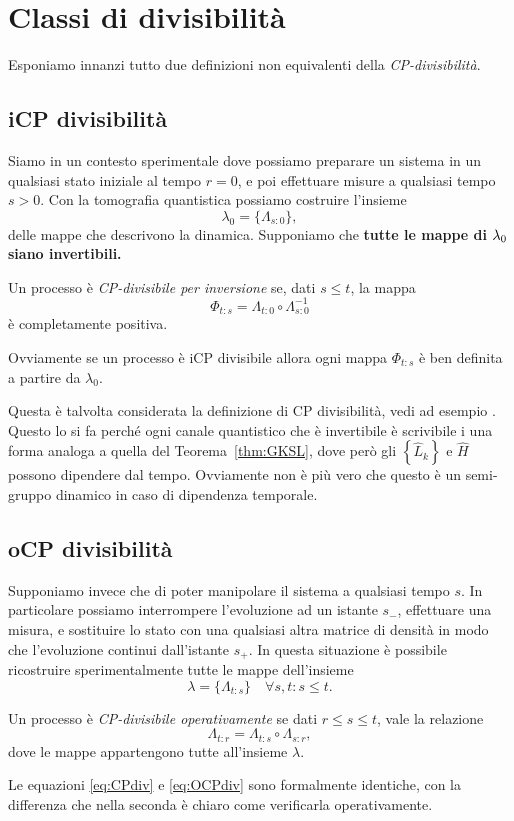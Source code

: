 \documentclass[a4]{article}
\begin{document}
\section{Classi di divisibilità}
Esponiamo innanzi tutto due definizioni non equivalenti della \emph{CP-divisibilità}.

\subsection{iCP divisibilità}
Siamo in un contesto sperimentale dove possiamo preparare un sistema in un qualsiasi
stato iniziale al tempo \(r=0\), e poi effettuare misure a qualsiasi tempo \(s>0\).
Con la tomografia  quantistica  possiamo costruire  l'insieme
\[  \lambda_0 = \{\Lambda_{s\colon0}\}, \]
delle mappe che descrivono la dinamica. Supponiamo che \textbf{tutte le mappe di
\(\boldmath{\lambda_0}\) siano invertibili.}
\begin{defn}
Un processo è \emph{CP-divisibile per inversione} se, dati \(s \le  t\), la mappa
\[\Phi_{t\colon s} = \Lambda_{t\colon0} \circ \Lambda^{-1}_{s\colon0}\]
è completamente positiva.
\end{defn}
Ovviamente se un processo è iCP divisibile allora ogni mappa \(\Phi_{t\colon s}\) è
ben definita a partire da \(\lambda_0\).

Questa è talvolta considerata la definizione di CP divisibilità, vedi ad esempio
\cite{breuer2016colloquium}. Questo lo si fa perché ogni canale quantistico che
è invertibile è scrivibile i una forma analoga a quella del Teorema~\ref{thm:GKSL},
dove però gli \(\left\{\hat{L}_k\right\}\) e \(\hat{H}\) possono dipendere dal tempo.
Ovviamente non è più vero che questo è un semi-gruppo dinamico in caso di dipendenza
temporale.

\subsection{oCP divisibilità}
Supponiamo invece che di poter manipolare il sistema a qualsiasi tempo \(s\). In
particolare possiamo interrompere l'evoluzione ad un istante \(s_-\), effettuare una
misura, e sostituire lo stato con una qualsiasi altra matrice di densità in modo che
l'evoluzione continui dall'istante \(s_+\). In questa situazione è  possibile  ricostruire
sperimentalmente tutte le mappe dell'insieme
\[\lambda = \{\Lambda_{t\colon s}\}  \quad \forall s,t\colon s \le t.\]  
\begin{defn}
Un processo è \emph{CP-divisibile operativamente} se dati \(r \le s \le  t\), vale la
relazione 
\begin{equation} \label{eq:OCPdiv}
\Lambda_{t\colon r} = \Lambda_{t\colon s} \circ \Lambda_{s\colon r},
\end{equation}
dove le mappe appartengono tutte all'insieme \(\lambda\).
\end{defn}
Le equazioni \eqref{eq:CPdiv} e \eqref{eq:OCPdiv} sono formalmente identiche, con la
differenza che nella seconda è chiaro come verificarla operativamente.
\end{document}
